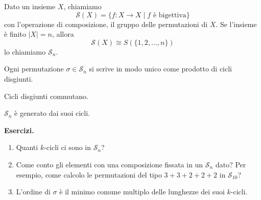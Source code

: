 \begin{multicols}{2}
\begin{definition}
	Dato un insieme $ X $, chiamiamo
	\[  \mathcal{S}(X) = \{ f: X \to X \mid f  \text{ è bigettiva}  \}  \]
	con l'operazione di composizione, il gruppo delle permutazioni di $ X $. Se l'insieme è finito $ |X| = n $, allora
	\[  \mathcal{S}(X) \cong S(\{ 1 ,2, \dots, n \})  \]
	lo chiamiamo $ \mathcal{S}_n $.
\end{definition}

\begin{prop}
	Ogni permutazione $ \sigma \in \mathcal{S}_n $ si scrive in modo unico come prodotto di cicli disgiunti.
\end{prop}
\begin{remark}
	Cicli disgiunti commutano.
\end{remark}


\begin{remark}
	$ \mathcal{S}_n $ è generato dai suoi cicli.
\end{remark}

\textbf{Esercizi.}
\begin{enumerate}
	\item Quanti $ k $-cicli ci sono in $ \mathcal{S}_n $?
	\item Come conto gli elementi con una composizione fissata in un $ \mathcal{S}_n $ dato? Per esempio, come calcolo le permutazioni del tipo $ 3+3+2+2+2 $ in $ \mathcal{S}_{10} $?
	\item L'ordine di $ \sigma $ è il minimo comune multiplo delle lunghezze dei suoi $ k $-cicli.
\end{enumerate}


\end{multicols}
